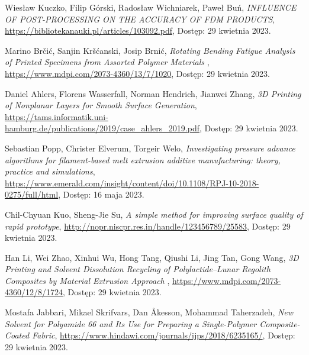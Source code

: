 \documentclass[12pt,a4paper]{article}
\begin{document}
\begin{thebibliography}{9}
Wiesław Kuczko, Filip Górski, Radosław Wichniarek, Paweł Buń,
\textit{INFLUENCE OF POST-PROCESSING ON THE ACCURACY OF FDM PRODUCTS},
\url{https://bibliotekanauki.pl/articles/103092.pdf},
Dostęp: 29 kwietnia 2023.

Marino Brčić, Sanjin Kršćanski, Josip Brnić,
\textit{Rotating Bending Fatigue Analysis of Printed Specimens from Assorted Polymer Materials },
\url{https://www.mdpi.com/2073-4360/13/7/1020},
Dostęp: 29 kwietnia 2023.

Daniel Ahlers, Florens Wasserfall, Norman Hendrich, Jianwei Zhang,
\textit{3D Printing of Nonplanar Layers for Smooth Surface Generation},
\url{https://tams.informatik.uni-hamburg.de/publications/2019/case_ahlers_2019.pdf},
Dostęp: 29 kwietnia 2023.

Sebastian Popp, Christer Elverum, Torgeir Welo,
\textit{Investigating pressure advance algorithms for filament-based melt extrusion additive manufacturing: theory, practice and simulations},
\url{https://www.emerald.com/insight/content/doi/10.1108/RPJ-10-2018-0275/full/html},
Dostęp: 16 maja 2023.

Chil-Chyuan Kuo, Sheng-Jie Su,
\textit{A simple method for improving surface quality of rapid prototype},
\url{http://nopr.niscpr.res.in/handle/123456789/25583},
Dostęp: 29 kwietnia 2023.

Han Li, Wei Zhao, Xinhui Wu, Hong Tang, Qiushi Li, Jing Tan, Gong Wang,
\textit{3D Printing and Solvent Dissolution Recycling of Polylactide–Lunar Regolith Composites by Material Extrusion Approach },
\url{https://www.mdpi.com/2073-4360/12/8/1724},
Dostęp: 29 kwietnia 2023.

Mostafa Jabbari, Mikael Skrifvars, Dan Åkesson, Mohammad Taherzadeh,
\textit{New Solvent for Polyamide 66 and Its Use for Preparing a Single-Polymer Composite-Coated Fabric},
\url{https://www.hindawi.com/journals/ijps/2018/6235165/},
Dostęp: 29 kwietnia 2023.

\end{thebibliography}

\ifpdf

\newpage

\listoffigures

\listoffeqs

\listofcodes

\fi
\end{document}

